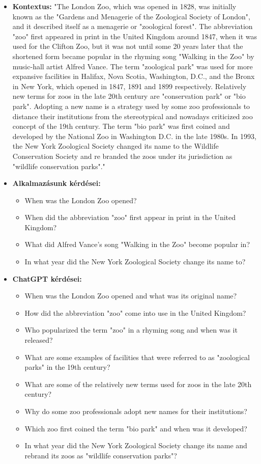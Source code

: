 \begin{itemize}
\item \textbf{Kontextus:} "The London Zoo, which was opened in 1828, was initially known as the "Gardens and Menagerie of the Zoological Society of London", and it described itself as a menagerie or "zoological forest". The abbreviation "zoo" first appeared in print in the United Kingdom around 1847, when it was used for the Clifton Zoo, but it was not until some 20 years later that the shortened form became popular in the rhyming song "Walking in the Zoo" by music-hall artist Alfred Vance. The term "zoological park" was used for more expansive facilities in Halifax, Nova Scotia, Washington, D.C., and the Bronx in New York, which opened in 1847, 1891 and 1899 respectively. Relatively new terms for zoos in the late 20th century are "conservation park" or "bio park". Adopting a new name is a strategy used by some zoo professionals to distance their institutions from the stereotypical and nowadays criticized zoo concept of the 19th century. The term "bio park" was first coined and developed by the National Zoo in Washington D.C. in the late 1980s. In 1993, the New York Zoological Society changed its name to the Wildlife Conservation Society and re branded the zoos under its jurisdiction as "wildlife conservation parks"."
\item \textbf{Alkalmazásunk kérdései:} 
	\begin{itemize}
		\item When was the London Zoo opened?
		\item When did the abbreviation "zoo" first appear in print in the United Kingdom?
		\item What did Alfred Vance's song "Walking in the Zoo" become popular in?
		\item In what year did the New York Zoological Society change its name to?
	\end{itemize}
\item \textbf{ChatGPT kérdései:} 
	\begin{itemize}
		\item When was the London Zoo opened and what was its original name?
		\item How did the abbreviation "zoo" come into use in the United Kingdom?
		\item Who popularized the term "zoo" in a rhyming song and when was it released?
		\item What are some examples of facilities that were referred to as "zoological parks" in the 19th century?
		\item What are some of the relatively new terms used for zoos in the late 20th century?
		\item Why do some zoo professionals adopt new names for their institutions?
		\item Which zoo first coined the term "bio park" and when was it developed?
		\item In what year did the New York Zoological Society change its name and rebrand its zoos as "wildlife conservation parks"?
	\end{itemize}
	

\end{itemize}
